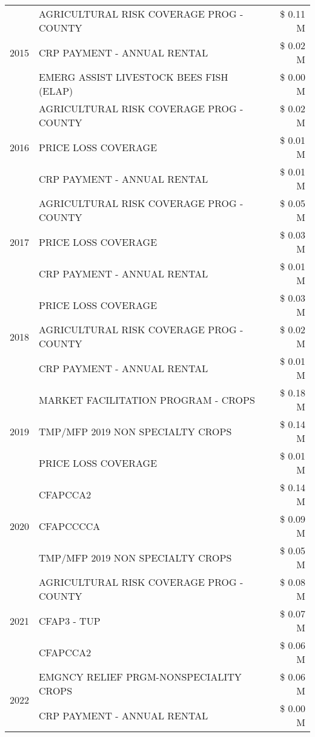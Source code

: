 \begin{tabular}{llr}
\cline{1-3}
\multirow[t]{3}{*}{2015} & AGRICULTURAL RISK COVERAGE PROG - COUNTY & \$ 0.11 M \\
 & CRP PAYMENT - ANNUAL RENTAL & \$ 0.02 M \\
 & EMERG ASSIST LIVESTOCK BEES FISH (ELAP) & \$ 0.00 M \\
\cline{1-3}
\multirow[t]{3}{*}{2016} & AGRICULTURAL RISK COVERAGE PROG - COUNTY & \$ 0.02 M \\
 & PRICE LOSS COVERAGE & \$ 0.01 M \\
 & CRP PAYMENT - ANNUAL RENTAL & \$ 0.01 M \\
\cline{1-3}
\multirow[t]{3}{*}{2017} & AGRICULTURAL RISK COVERAGE PROG - COUNTY & \$ 0.05 M \\
 & PRICE LOSS COVERAGE & \$ 0.03 M \\
 & CRP PAYMENT - ANNUAL RENTAL & \$ 0.01 M \\
\cline{1-3}
\multirow[t]{3}{*}{2018} & PRICE LOSS COVERAGE & \$ 0.03 M \\
 & AGRICULTURAL RISK COVERAGE PROG - COUNTY & \$ 0.02 M \\
 & CRP PAYMENT - ANNUAL RENTAL & \$ 0.01 M \\
\cline{1-3}
\multirow[t]{3}{*}{2019} & MARKET FACILITATION PROGRAM - CROPS & \$ 0.18 M \\
 & TMP/MFP 2019 NON SPECIALTY CROPS & \$ 0.14 M \\
 & PRICE LOSS COVERAGE & \$ 0.01 M \\
\cline{1-3}
\multirow[t]{3}{*}{2020} & CFAPCCA2 & \$ 0.14 M \\
 & CFAPCCCCA & \$ 0.09 M \\
 & TMP/MFP 2019 NON SPECIALTY CROPS & \$ 0.05 M \\
\cline{1-3}
\multirow[t]{3}{*}{2021} & AGRICULTURAL RISK COVERAGE PROG - COUNTY & \$ 0.08 M \\
 & CFAP3 - TUP & \$ 0.07 M \\
 & CFAPCCA2 & \$ 0.06 M \\
\cline{1-3}
\multirow[t]{2}{*}{2022} & EMGNCY RELIEF PRGM-NONSPECIALITY CROPS & \$ 0.06 M \\
 & CRP PAYMENT - ANNUAL RENTAL & \$ 0.00 M \\
\cline{1-3}
\bottomrule
\end{tabular}
